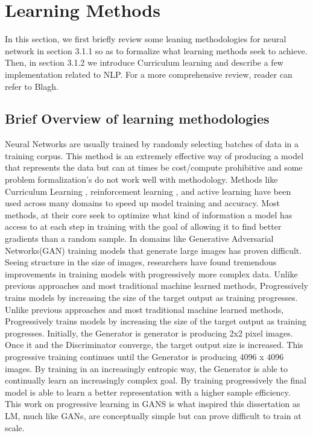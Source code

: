 \section{Learning Methods}
In this section, we first briefly review some leaning methodologies for neural network in section 3.1.1 so as to formalize what learning methods seek to achieve. Then, in section 3.1.2 we introduce Curriculum learning and describe a few implementation related to NLP. For a more comprehensive review, reader can refer to Blagh. 
\subsection{Brief Overview of learning methodologies}
Neural Networks are usually trained by randomly selecting batches of data in a training corpus. This method is an extremely effective way of producing a model that represents the data but can at times be cost/compute prohibitive and some problem formalization's do not work well with methodology. Methods like Curriculum Learning \cite{Bengio2009CurriculumL}, reinforcement learning \cite{Sutton1998ReinforcementLA}, and active learning \cite{Cohn1994ActiveLW} have been used across many domains to speed up model training and accuracy. Most methods, at their core seek to optimize what kind of information a model has access to at each step in training with the goal of allowing it to find better gradients than a random sample. In domains like Generative Adversarial Networks(GAN) \cite{Goodfellow2014GenerativeAN} training models that generate large images has proven difficult. Seeing structure in the size of images, researchers have found tremendous improvements in training models with progressively more complex data. Unlike previous approaches and most traditional machine learned methods, Progressively trains models by increasing the size of the target output as training progresses\cite{Karras2017ProgressiveGO}. Unlike previous approaches and most traditional machine learned methods, Progressively trains models by increasing the size of the target output as training progresses. Initially, the Generator is generator is producing 2x2 pixel images. Once it and the Discriminator converge, the target output size is increased. This progressive training continues until the Generator is producing 4096 x 4096 images. By training in an increasingly entropic way, the Generator is able to continually learn an increasingly complex goal. By training progressively the final model is able to learn a better representation with a higher sample efficiency. This work on progressive learning in GANS is what inspired this dissertation as LM, much like GANs, are conceptually simple but can prove difficult to train at scale. 
